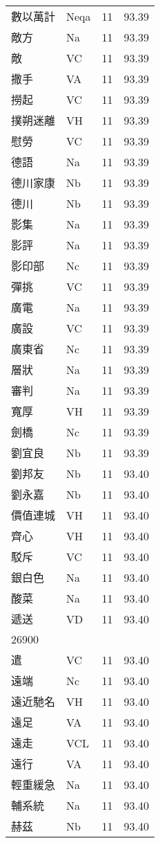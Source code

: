 \documentclass[twocolumn]{book}
\begin{document}
\begin{supertabular}{llrr}
數以萬計 & Neqa & 11 &  93.39\\
敵方 & Na & 11 &  93.39\\
敵 & VC & 11 &  93.39\\
撒手 & VA & 11 &  93.39\\
撈起 & VC & 11 &  93.39\\
撲朔迷離 & VH & 11 &  93.39\\
慰勞 & VC & 11 &  93.39\\
德語 & Na & 11 &  93.39\\
德川家康 & Nb & 11 &  93.39\\
德川 & Nb & 11 &  93.39\\
影集 & Na & 11 &  93.39\\
影評 & Na & 11 &  93.39\\
影印部 & Nc & 11 &  93.39\\
彈挑 & VC & 11 &  93.39\\
廣電 & Na & 11 &  93.39\\
廣設 & VC & 11 &  93.39\\
廣東省 & Nc & 11 &  93.39\\
層狀 & Na & 11 &  93.39\\
審判 & Na & 11 &  93.39\\
寬厚 & VH & 11 &  93.39\\
劍橋 & Nc & 11 &  93.39\\
劉宜良 & Nb & 11 &  93.39\\
劉邦友 & Nb & 11 &  93.40\\
劉永嘉 & Nb & 11 &  93.40\\
價值連城 & VH & 11 &  93.40\\
齊心 & VH & 11 &  93.40\\
駁斥 & VC & 11 &  93.40\\
銀白色 & Na & 11 &  93.40\\
酸菜 & Na & 11 &  93.40\\
遞送 & VD & 11 &  93.40\\
26900\\
遣 & VC & 11 &  93.40\\
遠端 & Nc & 11 &  93.40\\
遠近馳名 & VH & 11 &  93.40\\
遠足 & VA & 11 &  93.40\\
遠走 & VCL & 11 &  93.40\\
遠行 & VA & 11 &  93.40\\
輕重緩急 & Na & 11 &  93.40\\
輔系統 & Na & 11 &  93.40\\
赫茲 & Nb & 11 &  93.40\\

\end{supertabular}
\end{document}
